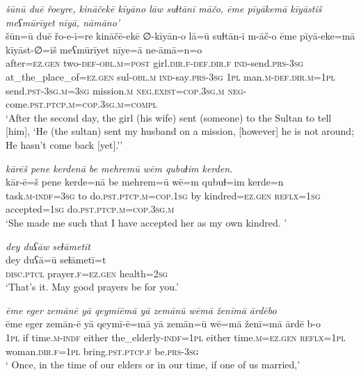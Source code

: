 \ea \label{ŽH.110}
\textit{šūnū duē řoeyre, kināčekē kīyāno lāw suɫtānī māčo, ēme pīyākemā kīyāstiš meʕmūrīyet nīyā, nāmāno’} \\ 
\gll šūn=ū duē řo-e-ī=re kināčē-ekē ∅-kīyān-o lā=ū suɫtān-ī m-āč-o ēme pīyā-eke=mā kīyāst-∅=iš meʕmūrīyet nīye=ā ne-āmā=n=o \\ 
 after\textsc{=ez}\textsc{.gen} two\textsc{-def}\textsc{-obl}\textsc{.m}\textsc{=\textsc{post}} girl\textsc{.dir}\textsc{\textsc{.f}}\textsc{-def}\textsc{.dir}\textsc{\textsc{.f}} \textsc{ind-}send\textsc{.prs}\textsc{-3sg} at\_the\_place\_of\textsc{=ez}\textsc{.gen} sul\textsc{-obl}\textsc{.m} \textsc{ind-}say\textsc{.prs}\textsc{-3sg} \textsc{1pl} man\textsc{.m}\textsc{-def}\textsc{.dir}\textsc{.m}\textsc{=1pl} send\textsc{.pst}\textsc{-3sg}\textsc{.m}\textsc{=3sg} mission\textsc{.m} \textsc{\textsc{neg.}exist}\textsc{=cop}\textsc{.3sg}\textsc{.m} \textsc{neg-}come\textsc{.pst}\textsc{.ptcp}\textsc{.m}\textsc{=cop}\textsc{.3sg}\textsc{.m}\textsc{=compl} \\ 
\glt `After the second day, the girl (his wife) sent (someone) to the Sultan to tell [him], ‘He (the sultan) sent my husband on a mission, [however] he is not around; He hasn’t come back [yet].’'
\z 
 
\ea \label{ŽH.117}
\textit{kārēš pene kerdenā be mehremū wēm qubuɫim kerden.} \\ 
\gll kār-ē=š pene kerde=nā be mehrem=ū wē=m qubuɫ=im kerde=n \\ 
 task\textsc{.m}\textsc{-indf}\textsc{=3sg} to do\textsc{.pst}\textsc{.ptcp}\textsc{.m}\textsc{=cop}\textsc{.1sg} by kindred\textsc{=ez}\textsc{.gen} \textsc{reflx}\textsc{=1sg} accepted\textsc{=1sg} do\textsc{.pst}\textsc{.ptcp}\textsc{.m}\textsc{=cop}\textsc{.3sg}\textsc{.m} \\ 
\glt `She made  me such that I have accepted her as my own kindred. '
\z 
 
\ea \label{ŽH.119}
\textit{dey duʕāw seɫāmetīt} \\ 
\gll dey duʕā=ū seɫāmetī=t \\ 
 \textsc{disc.ptcl} prayer\textsc{\textsc{.f}}\textsc{=ez}\textsc{.gen} health\textsc{=\textsc{2sg}} \\ 
\glt `That’s it. May good prayers  be for you.'
\z 



\ea \label{RE.2}
\textit{ēme eger zemānē yā qeymīēmā yā zemānū wēmā ženīmā ārdēbo} \\ 
\gll ēme eger zemān-ē yā qeymī-ē=mā yā zemān=ū wē=mā ženī=mā ārdē b-o \\ 
 \textsc{1pl} if time\textsc{.m}\textsc{-indf} either the\_elderly\textsc{-indf}\textsc{=\textsc{1pl}} either time\textsc{.m}\textsc{\textsc{=ez.gen}} \textsc{reflx}\textsc{=\textsc{1pl}} woman\textsc{.dir}\textsc{.f}\textsc{=\textsc{1pl}} bring\textsc{.pst}\textsc{.ptcp}\textsc{.f} be\textsc{.prs}\textsc{-3sg} \\ 
\glt ` Once, in the time of our elders or in our time, if one of us married,'
\z 
 
